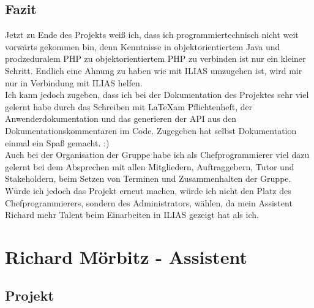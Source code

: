 \documentclass[a4paper]{scrreprt}
\begin{document}
\section{Fazit}
Jetzt zu Ende des Projekts weiß ich, dass ich programmiertechnisch nicht weit vorwärts gekommen bin, denn Kenntnisse in objektorientiertem Java und prodzeduralem PHP zu objektorientiertem PHP zu verbinden ist nur ein kleiner Schritt. Endlich eine Ahnung zu haben wie mit ILIAS umzugehen ist, wird mir nur in Verbindung mit ILIAS helfen.\\
Ich kann jedoch zugeben, dass ich bei der Dokumentation des Projektes sehr viel gelernt habe durch das Schreiben mit \LaTeX  am Pflichtenheft, der Anwenderdokumentation und das generieren der API aus den Dokumentationskommentaren im Code. Zugegeben hat selbst Dokumentation einmal ein Spaß gemacht. :)\\
Auch bei der Organisation der Gruppe habe ich als Chefprogrammierer viel dazu gelernt bei dem Absprechen mit allen Mitgliedern, Auftraggebern, Tutor und Stakeholdern, beim Setzen von Terminen und Zusammenhalten der Gruppe.
Würde ich jedoch das Projekt erneut machen, würde ich nicht den Platz des Chefprogrammierers, sondern des Administrators, wählen, da mein Assistent Richard mehr Talent beim Einarbeiten in ILIAS gezeigt hat als ich.

\chapter{Richard Mörbitz - Assistent}

\section{Projekt}
\end{document}
